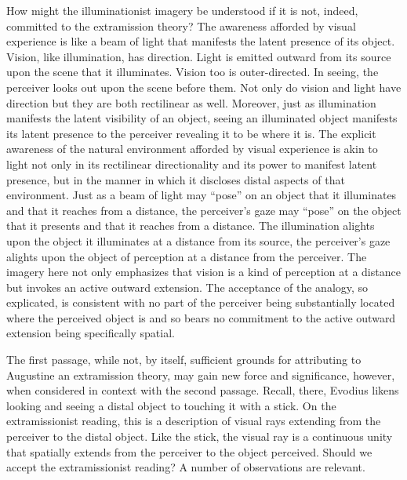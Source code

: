 \documentclass[12pt]{article}
\begin{document}
How might the illuminationist imagery be understood if it is not, indeed, committed to the extramission theory? The awareness afforded by visual experience is like a beam of light that manifests the latent presence of its object. Vision, like illumination, has direction. Light is emitted outward from its source upon the scene that it illuminates. Vision too is outer-directed. In seeing, the perceiver looks out upon the scene before them. Not only do vision and light have direction but they are both rectilinear as well. Moreover, just as illumination manifests the latent visibility of an object, seeing an illuminated object manifests its latent presence to the perceiver revealing it to be where it is. The explicit awareness of the natural environment afforded by visual experience is akin to light not only in its rectilinear directionality and its power to manifest latent presence, but in the manner in which it discloses distal aspects of that environment. Just as a beam of light may “pose” on an object that it illuminates and that it reaches from a distance, the perceiver’s gaze may “pose” on the object that it presents and that it reaches from a distance. The illumination alights upon the object it illuminates at a distance from its source, the perceiver’s gaze alights upon the object of perception at a distance from the perceiver. The imagery here not only emphasizes that vision is a kind of perception at a distance but invokes an active outward extension. The acceptance of the analogy, so explicated, is consistent with no part of the perceiver being substantially located where the perceived object is and so bears no commitment to the active outward extension being specifically spatial. 

The first passage, while not, by itself, sufficient grounds for attributing to Augustine an extramission theory, may gain new force and significance, however, when considered in context with the second passage. Recall, there, Evodius likens looking and seeing a distal object to touching it with a stick. On the extramissionist reading, this is a description of visual rays extending from the perceiver to the distal object. Like the stick, the visual ray is a continuous unity that spatially extends from the perceiver to the object perceived. Should we accept the extramissionist reading? A number of observations are relevant.
\end{document}

